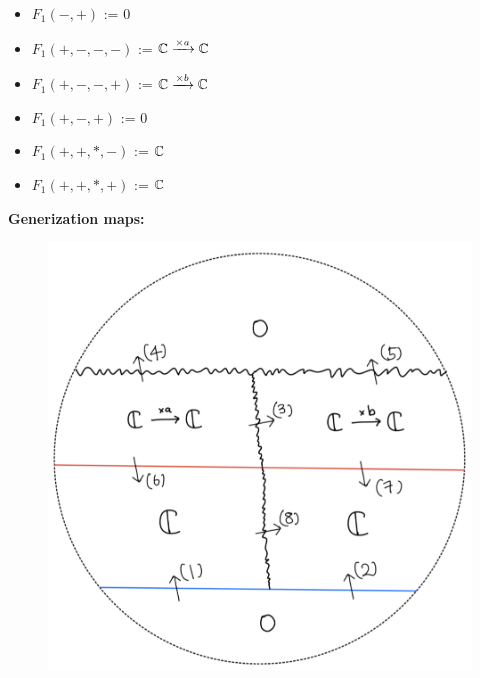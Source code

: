\begin{itemize}
\item $F_1(-,+)$ := $0$
\item $F_1(+,-,-,-)$ := $\mathbb{C} \xrightarrow{\times a} \mathbb{C} $
\item $F_1(+,-,-,+)$ := $\mathbb{C} \xrightarrow{\times b} \mathbb{C} $
\item $F_1(+,-,+)$ := $0$
\item $F_1(+,+,*,-)$ := $\mathbb{C}$
\item $F_1(+,+,*,+)$ := $\mathbb{C}$
\end{itemize}
\textbf{Generization maps:}
\begin{figure}[H]
    \centering
    \includegraphics[scale = 0.95]{diagrams/lemma2/47.png} 
    \caption{}
    \label{fig:your-label}
\end{figure}
